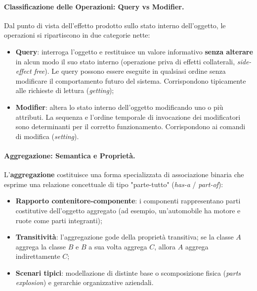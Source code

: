 \documentclass[12pt]{extarticle}
\begin{document}
\paragraph{Classificazione delle Operazioni: Query vs Modifier.}
Dal punto di vista dell'effetto prodotto sullo stato interno dell'oggetto, le operazioni si ripartiscono in due categorie nette:
\begin{itemize}
    \item \textbf{Query}: interroga l'oggetto e restituisce un valore informativo \textbf{senza alterare} in alcun modo il suo stato interno (operazione priva di effetti collaterali, \textit{side-effect free}). Le query possono essere eseguite in qualsiasi ordine senza modificare il comportamento futuro del sistema. Corrispondono tipicamente alle richieste di lettura (\textit{getting});
    \item \textbf{Modifier}: altera lo stato interno dell'oggetto modificando uno o più attributi. La sequenza e l'ordine temporale di invocazione dei modificatori sono determinanti per il corretto funzionamento. Corrispondono ai comandi di modifica (\textit{setting}).
\end{itemize}

\paragraph{Aggregazione: Semantica e Proprietà.}
L'\textbf{aggregazione} costituisce una forma specializzata di associazione binaria che esprime una relazione concettuale di tipo "parte-tutto" (\textit{has-a} / \textit{part-of}):
\begin{itemize}
    \item \textbf{Rapporto contenitore-componente}: i componenti rappresentano parti costitutive dell'oggetto aggregato (ad esempio, un'automobile ha motore e ruote come parti integranti);
    \item \textbf{Transitività}: l'aggregazione gode della proprietà transitiva; se la classe $A$ aggrega la classe $B$ e $B$ a sua volta aggrega $C$, allora $A$ aggrega indirettamente $C$;
    \item \textbf{Scenari tipici}: modellazione di distinte base o scomposizione fisica (\textit{parts explosion}) e gerarchie organizzative aziendali.
\end{itemize}
\end{document}
